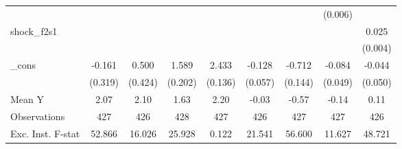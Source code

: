 {\begin{tabular}{l*{8}{c}}
            &                     &                     &                     &                     &                     &                     &     (0.006)         &                     \\
\addlinespace
shock\_f2s1  &                     &                     &                     &                     &                     &                     &                     &       0.025\sym{***}\\
            &                     &                     &                     &                     &                     &                     &                     &     (0.004)         \\
\addlinespace
\_cons      &      -0.161         &       0.500         &       1.589\sym{***}&       2.433\sym{***}&      -0.128\sym{**} &      -0.712\sym{***}&      -0.084         &      -0.044         \\
            &     (0.319)         &     (0.424)         &     (0.202)         &     (0.136)         &     (0.057)         &     (0.144)         &     (0.049)         &     (0.050)         \\
\midrule
Mean Y      &        2.07         &        2.10         &        1.63         &        2.20         &       -0.03         &       -0.57         &       -0.14         &        0.11         \\
Observations&         427         &         426         &         428         &         427         &         426         &         427         &         427         &         426         \\
Exc. Inst. F-stat&      52.866         &      16.026         &      25.928         &       0.122         &      21.541         &      56.600         &      11.627         &      48.721         \\
\bottomrule
\end{tabular}
}

